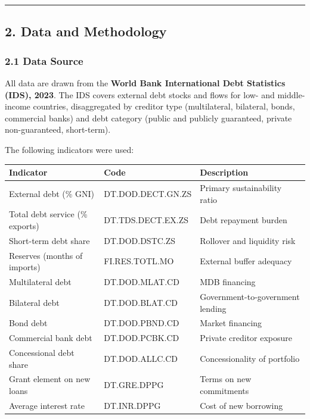 \documentclass[
  letterpaper,
  DIV=11,
  numbers=noendperiod]{scrartcl}
\begin{document}
\begin{center}\rule{0.5\linewidth}{0.5pt}\end{center}

\subsection{2. Data and Methodology}\label{data-and-methodology}

\subsubsection{2.1 Data Source}\label{data-source}

All data are drawn from the \textbf{World Bank International Debt
Statistics (IDS), 2023}. The IDS covers external debt stocks and flows
for low- and middle-income countries, disaggregated by creditor type
(multilateral, bilateral, bonds, commercial banks) and debt category
(public and publicly guaranteed, private non-guaranteed, short-term).

The following indicators were used:

\begin{longtable}[]{@{}
  >{\raggedright\arraybackslash}p{}
  >{\raggedright\arraybackslash}p{}
  >{\raggedright\arraybackslash}p{}@{}}
\toprule\noalign{}
\begin{minipage}[b]{\linewidth}\raggedright
Indicator
\end{minipage} & \begin{minipage}[b]{\linewidth}\raggedright
Code
\end{minipage} & \begin{minipage}[b]{\linewidth}\raggedright
Description
\end{minipage} \\
\midrule\noalign{}
\endhead
\bottomrule\noalign{}
\endlastfoot
External debt (\% GNI) & DT.DOD.DECT.GN.ZS & Primary sustainability
ratio \\
Total debt service (\% exports) & DT.TDS.DECT.EX.ZS & Debt repayment
burden \\
Short-term debt share & DT.DOD.DSTC.ZS & Rollover and liquidity risk \\
Reserves (months of imports) & FI.RES.TOTL.MO & External buffer
adequacy \\
Multilateral debt & DT.DOD.MLAT.CD & MDB financing \\
Bilateral debt & DT.DOD.BLAT.CD & Government-to-government lending \\
Bond debt & DT.DOD.PBND.CD & Market financing \\
Commercial bank debt & DT.DOD.PCBK.CD & Private creditor exposure \\
Concessional debt share & DT.DOD.ALLC.CD & Concessionality of
portfolio \\
Grant element on new loans & DT.GRE.DPPG & Terms on new commitments \\
Average interest rate & DT.INR.DPPG & Cost of new borrowing \\
\end{longtable}
\end{document}
